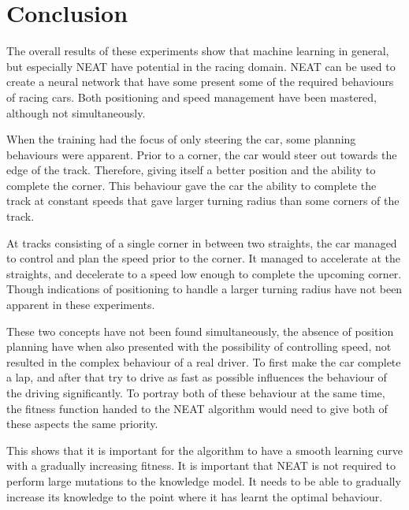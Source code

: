 \chapter{Conclusion}
\label{conclusion}
The overall results of these experiments show that machine learning in general, but especially NEAT have potential in the racing domain. NEAT can be used to create a neural network that have some present some of the required behaviours of racing cars. Both positioning and speed management have been mastered, although not simultaneously.

When the training had the focus of only steering the car, some planning behaviours were apparent. Prior to a corner, the car would steer out towards the edge of the track. Therefore, giving itself a better position and the ability to complete the corner. This behaviour gave the car the ability to complete the track at constant speeds that gave larger turning radius than some corners of the track.

At tracks consisting of a single corner in between two straights, the car managed to control and plan the speed prior to the corner. It managed to accelerate at the straights, and decelerate to a speed low enough to complete the upcoming corner. Though indications of positioning to handle a larger turning radius have not been apparent in these experiments.

These two concepts have not been found simultaneously, the absence of position planning have when also presented with the possibility of controlling speed, not resulted in the complex behaviour of a real driver. To first make the car complete a lap, and after that try to drive as fast as possible influences the behaviour of the driving significantly. To portray both of these behaviour at the same time, the fitness function handed to the NEAT algorithm would need to give both of these aspects the same priority.

This shows that it is important for the algorithm to have a smooth learning curve with a gradually increasing fitness. It is important that NEAT is not required to perform large mutations to the knowledge model. It needs to be able to gradually increase its knowledge to the point where it has learnt the optimal behaviour.


